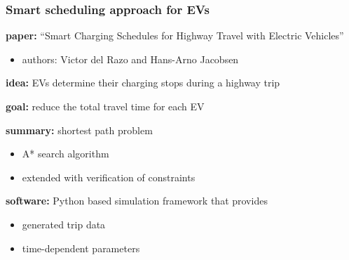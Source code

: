 \begin{frame}
\frametitle{Smart scheduling approach for EVs}

\begin{PraesentationAufzaehlung}
    \item \textbf{paper:} ``Smart Charging Schedules for Highway Travel with Electric Vehicles''
        \begin{itemize}
        \item authors: Victor del Razo and Hans-Arno Jacobsen
        \end{itemize}

    \item \textbf{idea:} EVs determine their charging stops during a highway trip

    \item \textbf{goal:} reduce the total travel time for each EV

    \item \textbf{summary:} shortest path problem
        \begin{itemize}
        \item A* search algorithm
        \item extended with verification of constraints
        \end{itemize}

    \item \textbf{software:} Python based simulation framework that provides
        \begin{itemize}
        \item generated trip data
        \item time-dependent parameters
        \end{itemize}

\end{PraesentationAufzaehlung}

\end{frame}
\clearpage



